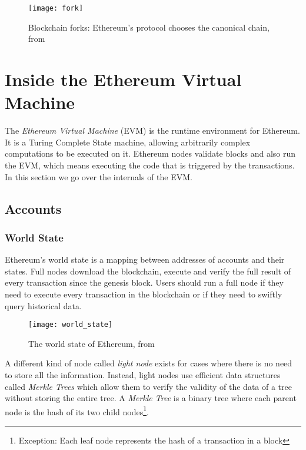 \begin{figure}[H]
    \centering
    \texttt{[image: fork]}
    \caption{Blockchain forks: Ethereum's protocol chooses the canonical chain, from \cite{preethi}}
    \label{fig:forking}
\end{figure}

\section{Inside the Ethereum Virtual Machine}
The \textit{Ethereum Virtual Machine} (EVM) is the runtime environment for Ethereum. It is a Turing Complete State machine, allowing arbitrarily complex computations to be executed on it. Ethereum nodes validate blocks and also run the EVM, which means executing the code that is triggered by the transactions. In this section we go over the internals of the EVM\@. 

\subsection{Accounts}

\subsubsection{World State}
Ethereum's world state is a mapping between addresses of accounts and their states. Full nodes download the blockchain, execute and verify the full result of every transaction since the genesis block. Users should run a full node if they need to execute every transaction in the blockchain or if they need to swiftly query historical data. 

\begin{figure}[H]
    \centering
    \texttt{[image: world\_state]}
    \caption{The world state of Ethereum, from~\cite{vitalik}}
    \label{fig:worldstate}
\end{figure}

A different kind of node called \textit{light node} exists for cases where there is no need to store all the information. Instead, light nodes use efficient data structures called \textit{Merkle Trees} which allow them to verify the validity of the data of a tree without storing the entire tree. A \textit{Merkle Tree} is a binary tree where each parent node is the hash of its two child nodes\footnote{Exception: Each leaf node represents the hash of a transaction in a block}. 

